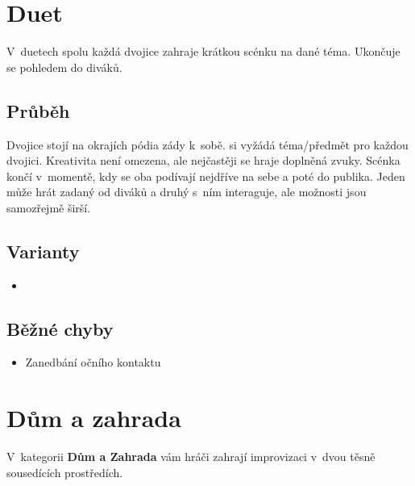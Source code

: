  
 
 
\needspace{5cm} \section{Duet} \label{duet}  
 
V~duetech spolu každá dvojice zahraje krátkou scénku na dané téma. Ukončuje se pohledem do diváků. 
 
\subsection{ Průběh } Dvojice stojí na okrajích pódia zády k~sobě.  si vyžádá téma/předmět pro každou dvojici. Kreativita není omezena, ale nejčastěji se hraje  doplněná zvuky. Scénka končí v~momentě, kdy se oba podívají nejdříve na sebe a poté do publika. 
Jeden  může hrát  zadaný od diváků a druhý s~ním interaguje, ale možnosti jsou samozřejmě širší. 
 
\subsection{ Varianty } \begin{itemize}
\item {}
\end{itemize}
 
\subsection{ Běžné chyby } \begin{itemize}
\item Zanedbání očního kontaktu
\end{itemize}
 
 
 
 
\needspace{5cm} \section{Dům a zahrada} \label{dům a zahrada}  
 
 
V~kategorii \textbf{Dům a Zahrada} vám hráči zahrají improvizaci v~dvou těsně sousedících prostředích. 
 
 
